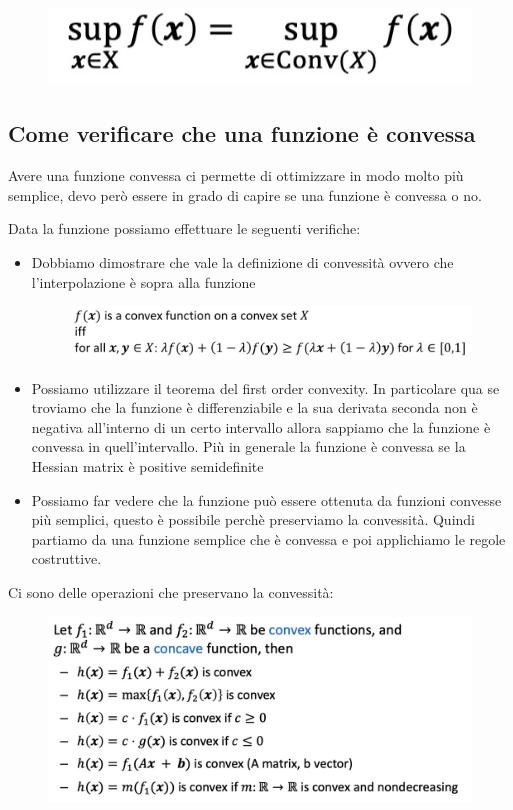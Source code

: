 \documentclass[14pt]{extreport}
\begin{document}
\begin{figure}[H]
	\centering
	\includegraphics[width=0.7\linewidth]{233.jpeg}
\end{figure}

\subsection{Come verificare che una funzione è convessa}

Avere una funzione convessa ci permette di ottimizzare in modo molto più semplice, devo però essere in grado di capire se una funzione è convessa o
no.

Data la funzione possiamo effettuare le seguenti verifiche:

\begin{itemize}
	\item Dobbiamo dimostrare che vale la definizione di convessità ovvero che l'interpolazione è sopra alla funzione
	      \begin{figure}[H]
		      \centering
		      \includegraphics[width=0.7\linewidth]{234.jpeg}
	      \end{figure}

	\item Possiamo utilizzare il teorema del first order convexity. In particolare qua se troviamo che la funzione è differenziabile e la sua derivata
	      seconda non è negativa all'interno di un certo intervallo allora sappiamo che la funzione è convessa in quell'intervallo. Più in generale la
	      funzione è convessa se la Hessian matrix è positive semidefinite
	\item Possiamo far vedere che la funzione può essere ottenuta da funzioni convesse più semplici, questo è possibile perchè preserviamo la
	      convessità. Quindi partiamo da una funzione semplice che è convessa e poi applichiamo le regole costruttive.
\end{itemize}

Ci sono delle operazioni che preservano la convessità:

\begin{figure}[H]
	\centering
	\includegraphics[width=0.7\linewidth]{235.jpeg}
\end{figure}
\end{document}

